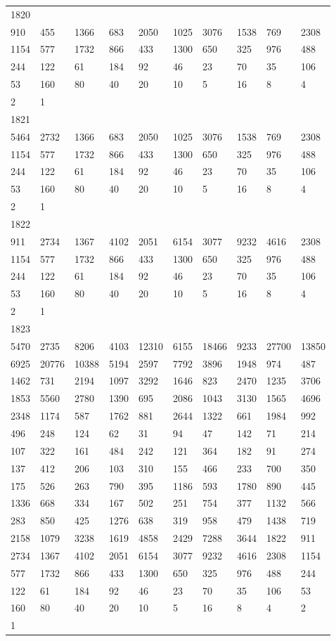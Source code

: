 \begin{longtable}{*{10}{l}}
1820&&&&&&&&&\\
910& 455& 1366& 683& 2050& 1025& 3076& 1538& 769& 2308\\
1154& 577& 1732& 866& 433& 1300& 650& 325& 976& 488\\
244& 122& 61& 184& 92& 46& 23& 70& 35& 106\\
53& 160& 80& 40& 20& 10& 5& 16& 8& 4\\
2& 1& \\

1821&&&&&&&&&\\
5464& 2732& 1366& 683& 2050& 1025& 3076& 1538& 769& 2308\\
1154& 577& 1732& 866& 433& 1300& 650& 325& 976& 488\\
244& 122& 61& 184& 92& 46& 23& 70& 35& 106\\
53& 160& 80& 40& 20& 10& 5& 16& 8& 4\\
2& 1& \\

1822&&&&&&&&&\\
911& 2734& 1367& 4102& 2051& 6154& 3077& 9232& 4616& 2308\\
1154& 577& 1732& 866& 433& 1300& 650& 325& 976& 488\\
244& 122& 61& 184& 92& 46& 23& 70& 35& 106\\
53& 160& 80& 40& 20& 10& 5& 16& 8& 4\\
2& 1& \\

1823&&&&&&&&&\\
5470& 2735& 8206& 4103& 12310& 6155& 18466& 9233& 27700& 13850\\
6925& 20776& 10388& 5194& 2597& 7792& 3896& 1948& 974& 487\\
1462& 731& 2194& 1097& 3292& 1646& 823& 2470& 1235& 3706\\
1853& 5560& 2780& 1390& 695& 2086& 1043& 3130& 1565& 4696\\
2348& 1174& 587& 1762& 881& 2644& 1322& 661& 1984& 992\\
496& 248& 124& 62& 31& 94& 47& 142& 71& 214\\
107& 322& 161& 484& 242& 121& 364& 182& 91& 274\\
137& 412& 206& 103& 310& 155& 466& 233& 700& 350\\
175& 526& 263& 790& 395& 1186& 593& 1780& 890& 445\\
1336& 668& 334& 167& 502& 251& 754& 377& 1132& 566\\
283& 850& 425& 1276& 638& 319& 958& 479& 1438& 719\\
2158& 1079& 3238& 1619& 4858& 2429& 7288& 3644& 1822& 911\\
2734& 1367& 4102& 2051& 6154& 3077& 9232& 4616& 2308& 1154\\
577& 1732& 866& 433& 1300& 650& 325& 976& 488& 244\\
122& 61& 184& 92& 46& 23& 70& 35& 106& 53\\
160& 80& 40& 20& 10& 5& 16& 8& 4& 2\\
1& \\


\end{longtable}
